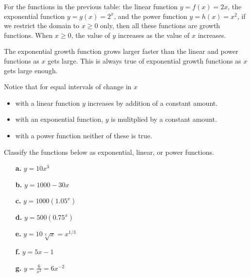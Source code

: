 For the functions in the previous table: the linear function \( y = f(x) = 2x \), the exponential function \( y = g(x) = 2^x \), and the power function \( y = h(x) = x^2 \), if we restrict the domain to \( x \geq 0 \) only, then all these functions are growth functions. When \( x \geq 0 \), the value of \( y \) increases as the value of \( x \) increases.

The exponential growth function grows larger faster than the linear and power functions as \( x \) gets large. This is always true of exponential growth functions as \( x \) gets large enough.

Notice that for equal intervals of change in \(x\)
\begin{itemize}
    \item with a linear function \(y\) increases by addition of a constant amount.
    \item with an exponential function, \(y\) is mulitplied by a constant amount.
    \item with a power function neither of these is true.
\end{itemize}

\begin{example}
    Classify the functions below as exponential, linear, or power functions.
    \begin{enumerate}
        \item[\textbf{a.}] \( y = 10x^3 \)
        \item[\textbf{b.}] \( y = 1000 - 30x \)
        \item[\textbf{c.}] \( y = 1000(1.05^x) \)
        \item[\textbf{d.}] \( y = 500(0.75^x) \)
        \item[\textbf{e.}] \( y = 10\sqrt[3]{x} = x^{1/3} \)
        \item[\textbf{f.}] \( y = 5x - 1 \)
        \item[\textbf{g.}] \( y = \frac{6}{x^2} = 6x^{-2} \)
    \end{enumerate}
\end{example}

